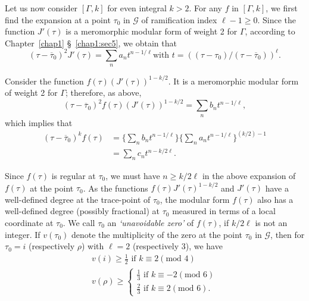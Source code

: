 Let us now consider $[\Gamma, k]$ for even integral $k>2$. For any
$f$ in $[\Gamma, k]$, we first find the expansion at a point $\tau_0$
in $\mathscr{G}$ of ramification index $\ell-1\geq 0$. Since the
function $J'(\tau)$ is a meromorphic modular form of weight 2 for
$\Gamma$, according to Chapter~\ref{chap1} \S~\ref{chap1:sec5}, we obtain that 
$$
(\tau-\overline{\tau}_0)^2 J' (\tau) = \sum_n a_n t^{n-1/\ell} \text{
  with } t = ((\tau-\tau_0)/(\tau-\overline{\tau}_0))^{\ell}.
$$

Consider the function $f(\tau)(J'(\tau))^{1-k/2}$. It is a meromorphic
modular form of weight 2 for $\Gamma$; therefore, as above,
$$
(\tau-\overline{\tau}_0)^2 f(\tau) (J'(\tau))^{1-k/2} = \sum_n b_n
t^{n-1/\ell}, 
$$
which implies that
\begin{align*}
(\tau-\overline{\tau}_0)^k f(\tau) & = \{\sum_n b_n t^{n-1/\ell}\}
  \{\sum_n a_n t^{n-1/\ell}\}^{(k/2)-1}\\
& = \sum_n c_n t^{n-k/2\ell}.
\end{align*}

Since $f(\tau)$ is regular at $\tau_0$, we must have $n \geq k/2\ell$
in the above expansion of $f(\tau)$ at the point $\tau_0$. As the
functions $f(\tau)J'(\tau)^{1-k/2}$ and $J'(\tau)$ have a well-defined
degree at the trace-point of $\tau_0$, the modular \pageoriginale form
$f(\tau)$ also has a well-defined degree (possibly fractional) at
$\tau_0$ measured in terms of a local coordinate at $\tau_0$. We call
$\tau_0$ an \textit{`unavoidable zero'} of $f(\tau)$, if $k/2\ell$ is
not an integer. If $v(\tau_0)$ denote the multiplicity of the zero at
the point $\tau_0$ in $\mathscr{G}$, then for $\tau_0=i$ (respectively
$\rho$) with $\ell=2$ (respectively 3), we have
\begin{gather*}
v(i) \geq \frac{1}{2} \text{ if } k \equiv 2 (\text{mod } 4)\\
v(\rho) \geq \begin{cases}
\frac{1}{3} \text{ if } k \equiv -2 (\text{mod } 6)\\
\frac{2}{3} \text{ if } k \equiv 2 (\text{mod } 6).
\end{cases}
\end{gather*}

